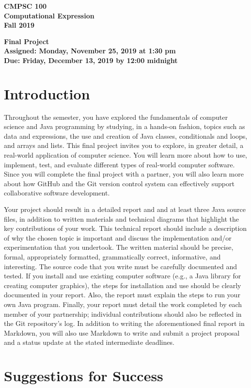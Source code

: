 \documentclass[11pt]{article}
\newcommand{\assignmentduedate}{December 13}
\newcommand{\assignmentassignedate}{November 25}
\newcommand{\labyear}{2019}
\newcommand{\labday}{Monday}
\newcommand{\labdueday}{Friday}
\newcommand{\labtime}{1:30 pm}
\newcommand{\labduetime}{12:00 midnight}
\newcommand{\assigneddate}{Assigned: \labday, \assignmentassignedate, \labyear{} at \labtime{}}
\newcommand{\duedate}{Due: \labdueday, \assignmentduedate, \labyear{} by \labduetime{}}
\newcommand{\labtitle}[1]
{
  \begin{center}
    \begin{center}
      \bf
      CMPSC 100\\Computational Expression\\
      Fall 2019\\
      \medskip
    \end{center}
    \bf
    #1
  \end{center}
}
\begin{document}
\thispagestyle{empty}

\labtitle{Final Project \\ \assigneddate{} \\ \duedate{}}

\section*{Introduction}

Throughout the semester, you have explored the fundamentals of computer science
and Java programming by studying, in a hands-on fashion, topics such as data and
expressions, the use and creation of Java classes, conditionals and loops, and
arrays and lists. This final project invites you to explore, in greater detail,
a real-world application of computer science. You will learn more about how to
use, implement, test, and evaluate different types of real-world computer
software. Since you will complete the final project with a partner, you will
also learn more about how GitHub and the Git version control system can
effectively support collaborative software development.

Your project should result in a detailed report and and at least three Java
source files, in addition to written materials and technical diagrams that
highlight the key contributions of your work. This technical report should
include a description of why the chosen topic is important and discuss the
implementation and/or experimentation that you undertook. The written material
should be precise, formal, appropriately formatted, grammatically correct,
informative, and interesting. The source code that you write must be carefully
documented and tested. If you install and use existing computer software (e.g.,
a Java library for creating computer graphics), the steps for installation and
use should be clearly documented in your report. Also, the report must explain
the steps to run your own Java program. Finally, your report must detail the
work completed by each member of your partnership; individual contributions
should also be reflected in the Git repository's log. In addition to writing the
aforementioned final report in Markdown, you will also use Markdown to write and
submit a project proposal and a status update at the stated intermediate
deadlines.

\section*{Suggestions for Success}
\end{document}
